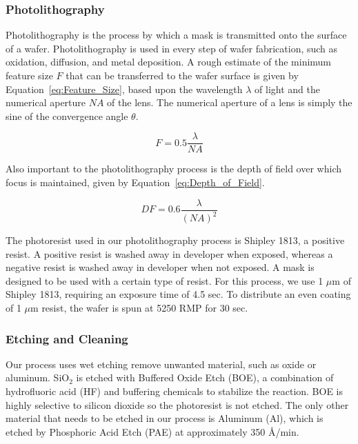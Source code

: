 \documentclass[letter,12pt]{article}
\begin{document}
		\subsubsection{Photolithography}
			\FloatBarrier
			Photolithography is the process by which a mask is transmitted onto the surface of a wafer.  Photolithography is used in every step of wafer fabrication, such as oxidation, diffusion, and metal deposition. A rough estimate of the minimum feature size $F$ that can be transferred to the wafer surface is given by Equation~\ref{eq:Feature_Size}, based upon the wavelength $\lambda$ of light and the numerical aperture $NA$ of the lens. The numerical aperture of a lens is simply the sine of the convergence angle $\theta$.
		
			\begin{equation}
				F = 0.5 \frac{\lambda}{NA}
				\label{eq:Feature_Size}
			\end{equation}
			
			Also important to the photolithography process is the depth of field over which focus is maintained, given by Equation~\ref{eq:Depth_of_Field}.
			
			\begin{equation}
				DF = 0.6 \frac{\lambda}{(NA)^2}
				\label{eq:Depth_of_Field}
			\end{equation}
			
			The photoresist used in our photolithography process is Shipley 1813, a positive resist.  A positive resist is washed away in developer when exposed, whereas a negative resist is washed away in developer when not exposed. A mask is designed to be used with a certain type of resist. For this process, we use 1 $\mu$m of Shipley 1813, requiring an exposure time of 4.5 sec. To distribute an even coating of 1 $\mu$m resist, the wafer is spun at 5250 RMP for 30 sec. \cite{Shipley_1800}
		
		\subsubsection{Etching and Cleaning}
			\FloatBarrier
			Our process uses wet etching remove unwanted material, such as oxide or aluminum. SiO$_2$ is etched with Buffered Oxide Etch (BOE), a combination of hydrofluoric acid (HF) and buffering chemicals to stabilize the reaction. BOE is highly selective to silicon dioxide so the photoresist is not etched.  The only other material that needs to be etched in our process is Aluminum (Al), which is etched by Phosphoric Acid Etch (PAE) at approximately 350 \AA/min. \cite{Lab_Manual}
			
\end{document}
